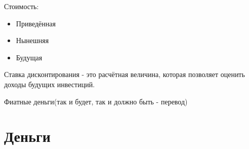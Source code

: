\documentclass[a4paper, 12pt]{article}
\begin{document}
	Стоимость:
	\begin{itemize}
		\item Приведённая
		\item Нынешняя
		\item Будущая
	\end{itemize}

	Ставка дисконтирования - это расчётная величина, которая позволяет оценить доходы будущих инвестиций.
	
	Фиатные деньги(так и будет, так и должно быть - перевод)

	\section{Деньги}
	
	\section{}
	
	\section{}
	
\end{document}
